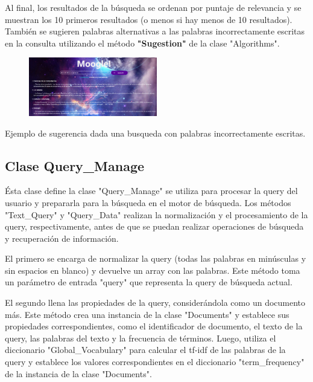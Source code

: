 \documentclass{article}
\begin{document}
Al final, los resultados de la búsqueda se ordenan por puntaje de relevancia y se muestran los 10 primeros resultados (o menos si hay menos de 10 resultados). También se sugieren palabras alternativas a las palabras incorrectamente escritas en la consulta utilizando el método \textbf{"Sugestion"} de la clase "Algorithms".

\begin{figure}[h!]
\centering
\includegraphics[width=0.5\textwidth]{../Informe/photos/img_6.png}
\end{figure}

\begin{center}
Ejemplo de sugerencia dada una busqueda con palabras incorrectamente escritas.
\end{center}

\subsection{Clase Query\_Manage}

Ésta clase define la clase "Query\_Manage" se utiliza para procesar la query del usuario y prepararla para la búsqueda en el motor de búsqueda. Los métodos "Text\_Query" y "Query\_Data" realizan la normalización y el procesamiento de la query, respectivamente, antes de que se puedan realizar operaciones de búsqueda y recuperación de información.

El primero se encarga de normalizar la query (todas las palabras en minúsculas y sin espacios en blanco) y devuelve un array con las palabras. Este método toma un parámetro de entrada "query" que representa la query de búsqueda actual. 

El segundo llena las propiedades de la query, considerándola como un documento más. Este método crea una instancia de la clase "Documents" y establece sus propiedades correspondientes, como el identificador de documento, el texto de la query, las palabras del texto y la frecuencia de términos. Luego, utiliza el diccionario "Global\_Vocabulary" para calcular el tf-idf de las palabras de la query y establece los valores correspondientes en el diccionario "term\_frequency" de la instancia de la clase "Documents".
\end{document}
